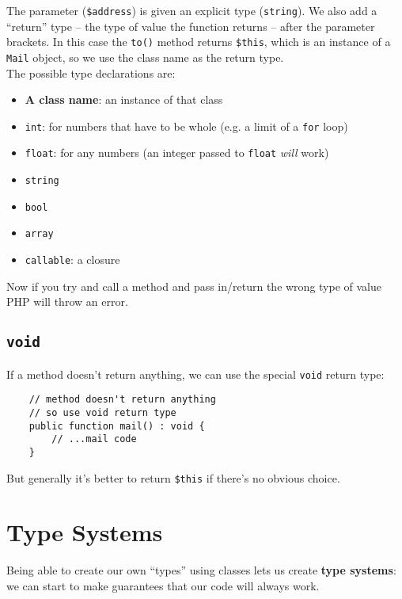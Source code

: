 The parameter (\texttt{\$address}) is given an explicit type (\texttt{string}). We also add a ``return'' type – the type of value the function returns – after the parameter brackets. In this case the \texttt{to()} method returns \texttt{\$this}, which is an instance of a \texttt{Mail} object, so we use the class name as the return type.
\\

The possible type declarations are:

\begin{itemize}
    \item \textbf{A class name}: an instance of that class
    \item \texttt{int}: for numbers that have to be whole (e.g. a limit of a \texttt{for} loop)
    \item \texttt{float}: for any numbers (an integer passed to \texttt{float} \textit{will} work)
    \item \texttt{string}
    \item \texttt{bool}
    \item \texttt{array}
    \item \texttt{callable}: a closure
\end{itemize}

Now if you try and call a method and pass in/return the wrong type of value PHP will throw an error.

\subsection{\texttt{void}}

If a method doesn't return anything, we can use the special \texttt{void} return type:

\begin{verbatim}
    // method doesn't return anything
    // so use void return type
    public function mail() : void {
        // ...mail code
    }
\end{verbatim}

But generally it's better to return \texttt{\$this} if there's no obvious choice.


\section{Type Systems}

Being able to create our own ``types'' using classes lets us create \textbf{type systems}: we can start to make guarantees that our code will always work.
\\

